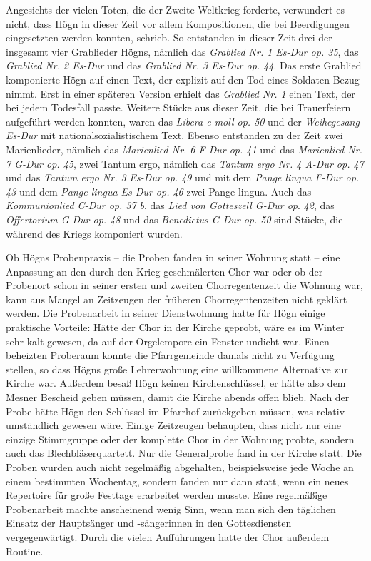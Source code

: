 \documentclass{book}
\begin{document}
Angesichts der vielen Toten, die der Zweite Weltkrieg forderte,
verwundert es nicht, dass Högn in dieser Zeit vor allem
Kompositionen, die bei Beerdigungen eingesetzten werden konnten,
schrieb. So entstanden in dieser Zeit drei der insgesamt vier
Grablieder Högns, nämlich das \textit{Grablied Nr. 1 Es-Dur op. 35},
das \textit{Grablied Nr. 2 Es-Dur} und das \textit{Grablied Nr. 3
Es-Dur op. 44}. Das erste Grablied komponierte Högn auf einen Text, der
explizit auf den Tod eines Soldaten Bezug nimmt. Erst in einer späteren
Version erhielt das \textit{Grablied Nr. 1} einen Text, der bei jedem
Todesfall passte. Weitere Stücke aus dieser Zeit, die bei Trauerfeiern
aufgeführt werden konnten, waren das \textit{Libera e-moll op. 50} und
der \textit{Weihegesang Es-Dur} mit nationalsozialistischem Text.
Ebenso entstanden zu der Zeit zwei Marienlieder, nämlich das
\textit{Marienlied Nr. 6 F-Dur op. 41} und das \textit{Marienlied Nr. 7
G-Dur op. 45}, zwei Tantum ergo, nämlich das \textit{Tantum ergo Nr. 4
A-Dur op. 47} und das \textit{Tantum ergo Nr. 3 Es-Dur} \textit{op. 49}
und mit dem \textit{Pange lingua F-Dur op. 43} und dem \textit{Pange
lingua Es-Dur op. 46} zwei Pange lingua. Auch das \textit{Kommunionlied
C-Dur op. 37 b}, das \textit{Lied von Gotteszell G-Dur op}.
\textit{42}, das \textit{Offertorium G-Dur op. 48} und das
\textit{Benedictus G-Dur op. 50} sind Stücke, die während des Kriegs
komponiert wurden.

Ob Högns Probenpraxis – die Proben fanden in seiner Wohnung statt – eine
Anpassung an den durch den Krieg geschmälerten Chor war oder ob der
Probenort schon in seiner ersten und zweiten Chorregentenzeit die
Wohnung war, kann aus Mangel an Zeitzeugen der früheren
Chorregentenzeiten nicht geklärt werden. Die Probenarbeit in seiner
Dienstwohnung hatte für Högn einige praktische Vorteile: Hätte der Chor
in der Kirche geprobt, wäre es im Winter sehr kalt gewesen, da auf der
Orgelempore ein Fenster undicht war. Einen beheizten Proberaum konnte
die Pfarrgemeinde damals nicht zu Verfügung stellen, so dass Högns
große Lehrerwohnung eine willkommene Alternative zur Kirche war.
Außerdem besaß Högn keinen Kirchenschlüssel, er hätte also dem Mesner
Bescheid geben müssen, damit die Kirche abends offen blieb. Nach der
Probe hätte Högn den Schlüssel im Pfarrhof zurückgeben müssen, was
relativ umständlich gewesen wäre. Einige Zeitzeugen behaupten, dass
nicht nur eine einzige Stimmgruppe oder der komplette Chor in der
Wohnung probte, sondern auch das Blechbläserquartett. Nur die
Generalprobe fand in der Kirche statt. Die Proben wurden auch nicht
regelmäßig abgehalten, beispielsweise jede Woche an einem bestimmten
Wochentag, sondern fanden nur dann statt, wenn ein neues Repertoire
für große Festtage erarbeitet werden musste. Eine regelmäßige
Probenarbeit machte anscheinend wenig Sinn, wenn man sich den täglichen
Einsatz der Hauptsänger und -sängerinnen in den Gottesdiensten
vergegenwärtigt. Durch die vielen Aufführungen hatte der Chor
außerdem Routine.
\end{document}
